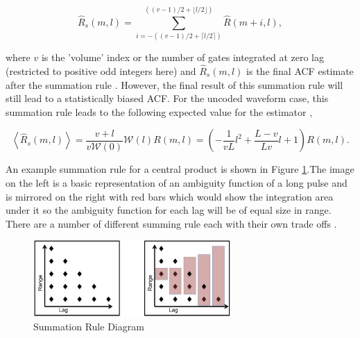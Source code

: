 \begin{equation}
\label{eq:sumrule}
\widehat{R}_s(m,l) = \displaystyle\sum\limits_{i=-((v-1)/2+\lceil l/2 \rceil)}^{((v-1)/2+\lfloor l/2\rfloor)} \widehat{R}(m+i,l),
\end{equation}

\noindent where $v$ is the 'volume' index or the number of gates integrated at zero lag (restricted to positive odd integers here) and $\widehat{R}_s(m,l)$ is the final ACF estimate after the summation rule \cite{nygren1996}. 
However, the final result of this summation rule will still lead to a statistically biased ACF. For the uncoded waveform case, this summation rule leads to the following expected value for the estimator \cite{nygren1996},

\begin{equation}
\label{eq:sumruleest}
\left\langle\widehat{R}_s(m,l) \right\rangle  =\frac{v+l}{v\mathcal{W}(0)}\mathcal{W}(l)R(m,l) =\left(-\frac{1}{vL}l^2+\frac{L-v}{Lv}l+1\right)   R(m,l).
\end{equation}

An example summation rule for a central product is shown in Figure \ref{fig:sumrule}.The image on the left is a basic representation of an ambiguity function of a long pulse and is mirrored on the right with red bars which would show the integration area under it so the ambiguity function for each lag will be of equal size in range. There are a number of different summing rule each with their own trade offs \cite{nygren1996}.

\begin{figure}[!t]
\centering
\includegraphics[width=3in]{sumrule}
\caption{Summation Rule Diagram}
\label{fig:sumrule}
\end{figure}





